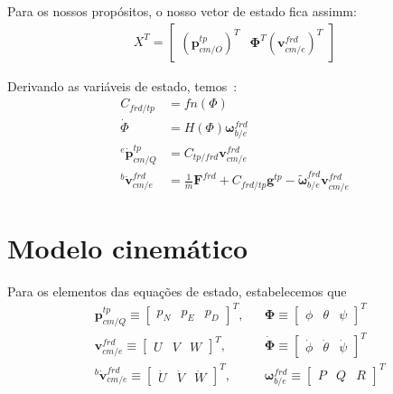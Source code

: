 Para os nossos propósitos, o nosso vetor de estado fica assimm:
\begin{align*}\tag{1.7-17}
    {X}^{T} = \begin{bmatrix} {\left( \mathbf{p}^{tp}_{cm/O} \right)}^{T} & \mathbf{\Phi}^{T} {\left(\mathbf{v}^{frd}_{cm/e}\right)}^{T} \end{bmatrix}
\end{align*}

Derivando as variáveis de estado\footnotemark{}, temos~\cite{Stevens2016}:
\begin{align*}\tag{1.7-18}
    C_{frd/tp} &= fn \left( \Phi \right) \\
    \dot{\Phi} &=  H \left( \Phi \right) {\mathbf{\omega}^{frd}_{b/e}} \\
    {^{e}{\dot{\mathbf{p}}^{tp}_{cm/Q}}} &= {C_{tp/frd}}{\mathbf{v}^{frd}_{cm/e}} \\
    {^{b}{\dot{\mathbf{v}}^{frd}_{cm/e}}} &= \textstyle{\frac{1}{m}} {\mathbf{F}^{frd}} + {C_{frd/tp}}{\mathbf{g}^{tp}} - {\tilde{\mathbf{\omega}}^{frd}_{b/e}} {\mathbf{v}^{frd}_{cm/e}}
\end{align*}

\section{Modelo cinemático}

Para os elementos das equações de estado, estabelecemos que
\begin{align*}
    &\mathbf{p}^{tp}_{cm/Q} \equiv \begin{bmatrix} p_{N} & p_{E} & p_{D} \end{bmatrix}^{T},&
    &\mathbf{\Phi} \equiv \begin{bmatrix} \phi & \theta & \psi \end{bmatrix}^{T} \\
    &\mathbf{v}^{frd}_{cm/e} \equiv \begin{bmatrix} U & V & W \end{bmatrix}^{T},&
    &{\dot{\mathbf{\Phi}}} \equiv \begin{bmatrix} \dot{\phi} & \dot{\theta} & \dot{\psi} \end{bmatrix}^{T} \\
    &{^{b}{\dot{\mathbf{v}}}^{frd}_{cm/e}} \equiv \begin{bmatrix} {\dot{U}} & {\dot{V}} & {\dot{W}} \end{bmatrix}^{T}, &
    &\mathbf{\omega}^{frd}_{b/e} \equiv \begin{bmatrix} P & Q & R \end{bmatrix}^{T}
\end{align*}

